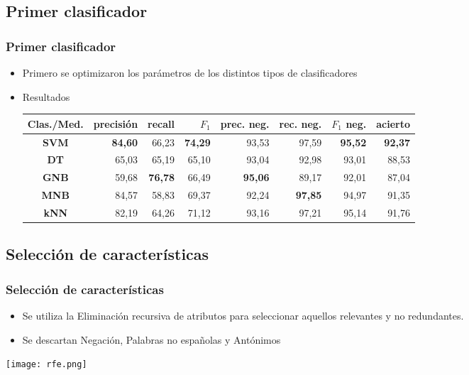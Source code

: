 \subsection{Primer clasificador}
\begin{frame}
    \frametitle{Primer clasificador}

    \begin{itemize}[<+->]
        \item Primero se optimizaron los parámetros de los distintos tipos de clasificadores
        \item Resultados

        \begin{center}
            \scriptsize

            \begin{tabular}{ c | r | r | r | r | r | r | r }
                \textbf{Clas./Med.} & precisión & recall & $F_1$ & prec. neg. & rec. neg. & $F_1$ neg. & acierto \\
                \hline
                \textbf{SVM} & \textbf{84,60} & 66,23 & \textbf{74,29} & 93,53 & 97,59 & \textbf{95,52} & \textbf{92,37} \\
                \hline
                \textbf{DT}  & 65,03 & 65,19 & 65,10 & 93,04 & 92,98 & 93,01 & 88,53 \\
                \hline
                \textbf{GNB} & 59,68 & \textbf{76,78} & 66,49 & \textbf{95,06} & 89,17 & 92,01 & 87,04 \\
                \hline
                \textbf{MNB} & 84,57 & 58,83 & 69,37 & 92,24 & \textbf{97,85} & 94,97 & 91,35 \\
                \hline
                \textbf{kNN} & 82,19 & 64,26 & 71,12 & 93,16 & 97,21 & 95,14 & 91,76 \\
            \end{tabular}
        \end{center}
    \end{itemize}
\end{frame}

\subsection{Selección de características}
\begin{frame}[allowframebreaks]
    \frametitle{Selección de características}

    \begin{itemize}
        \item Se utiliza la Eliminación recursiva de atributos para seleccionar aquellos relevantes y no redundantes.
        \item Se descartan Negación, Palabras no españolas y Antónimos
    \end{itemize}

    \begin{center}
        \texttt{[image: rfe.png]}
    \end{center}
\end{frame}

